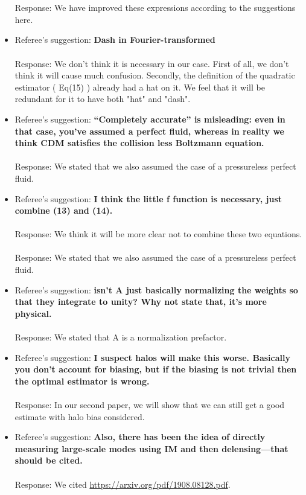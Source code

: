 \documentclass{article}
\begin{document}
\begin{itemize}
\\ \\Response: We have improved these expressions according to the suggestions here.
\item Referee's suggestion: \textbf{Dash in Fourier-transformed}
\\ \\Response: We don't think it is necessary in our case. First of all, we don't think it will cause much confusion. Secondly, the definition of the quadratic estimator ( Eq(15) ) already had a hat on it. We feel that it will be redundant for it to have both "hat" and "dash".
\item Referee's suggestion: \textbf{“Completely accurate” is misleading: even in that case, you’ve assumed a perfect fluid,
whereas in reality we think CDM satisfies the collision less Boltzmann equation.}
\\ \\Response: We stated that we also assumed the case of a pressureless perfect fluid.
\item Referee's suggestion: \textbf{I think the little f function is necessary, just combine (13) and (14).}
\\ \\Response: We think it will be more clear not to combine these two equations.
\\ \\Response: We stated that we also assumed the case of a pressureless perfect fluid.
\item Referee's suggestion: \textbf{isn’t A just basically normalizing the weights so that they integrate to unity?
Why not state that, it’s more physical.}
\\ \\Response: We stated that A is a normalization prefactor.
\item Referee's suggestion: \textbf{I suspect halos will make this worse. Basically you don’t account for biasing, but if the
biasing is not trivial then the optimal estimator is wrong.}
\\ \\Response: In our second paper, we will show that we can still get a good estimate with halo bias considered.
\item Referee's suggestion: \textbf{Also, there has been the idea of directly measuring large-scale modes using IM and then delensing—that should be cited.}
\\ \\Response: We cited \url{https://arxiv.org/pdf/1908.08128.pdf}.

\end{itemize}
\end{document}
